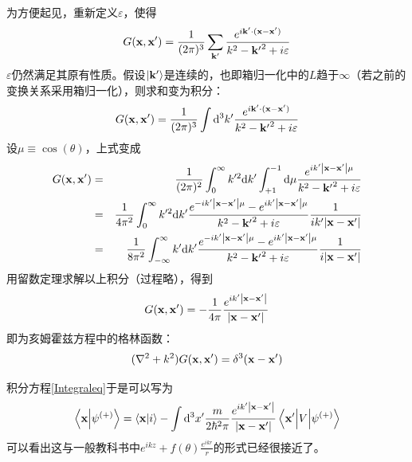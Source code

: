 \documentclass[hyperref]{ctexart}
\begin{document}
为方便起见，重新定义$\varepsilon$，使得
\begin{equation}\label{g4}
  G(\vb{x},\vb{x'})=\frac{1}{(2\pi)^3}\sum_{\vb{k'}}\frac{e^{i\vb{k'}\cdot(\vb{x}-\vb{x'})}}{k^2-\vb{k'}^2+i\varepsilon}
\end{equation}
$\varepsilon$仍然满足其原有性质。假设$\ket{\vb{k'}}$是连续的，也即箱归一化中的$L$趋于$\infty$（若之前的变换关系采用箱归一化），则求和变为积分：
\begin{equation}
   G(\vb{x},\vb{x'})=\frac{1}{(2\pi)^3}\int\dd^3k'\frac{e^{i\vb{k'}\cdot(\vb{x}-\vb{x'})}}{k^2-\vb{k'}^2+i\varepsilon}
\end{equation}
设$\mu\equiv\cos(\theta)$，上式变成
\begin{eqnarray}
  G(\vb{x},\vb{x'})&=& \frac{1}{(2\pi)^2}\int_0^{\infty}k'^2\dd k'\int_{+1}^{-1}\dd\mu\frac{e^{ik'\abs{\vb{x}-\vb{x'}}\mu}}{k^2-\vb{k'}^2+i\varepsilon} \\
   &=& \frac{1}{4\pi^2}\int_0^{\infty}k'^2\dd k'\frac{e^{-ik'\abs{\vb{x}-\vb{x'}}\mu}-e^{ik'\abs{\vb{x}-\vb{x'}}\mu}}{k^2-\vb{k'}^2+i\varepsilon}\frac{1}{ik'\abs{\vb{x}-\vb{x'}}}\\
   &=& \frac{1}{8\pi^2}\int_{-\infty}^{\infty}k'\dd k'\frac{e^{-ik'\abs{\vb{x}-\vb{x'}}\mu}-e^{ik'\abs{\vb{x}-\vb{x'}}\mu}}{k^2-\vb{k'}^2+i\varepsilon}\frac{1}{i\abs{\vb{x}-\vb{x'}}}
\end{eqnarray}
用留数定理求解以上积分（过程略），得到
\begin{equation}\label{g5}
   G(\vb{x},\vb{x'})=-\frac{1}{4\pi}\frac{e^{ik'\abs{\vb{x}-\vb{x'}}}}{\abs{\vb{x}-\vb{x'}}}
\end{equation}
即为亥姆霍兹方程中的格林函数：
\begin{equation}\label{helm}
  (\nabla^2+k^2)G(\vb{x},\vb{x'})=\delta^3(\vb{x}-\vb{x'})
\end{equation}

积分方程\eqref{Integraleq}于是可以写为
\begin{equation}\label{Inte2}
  \braket{\vb{x}}{\psi^{(+)}}=\braket{\vb{x}}{i}-\int\dd^3x'\frac{m}{2\hbar^2\pi}\frac{e^{ik'\abs{\vb{x}-\vb{x'}}}}{\abs{\vb{x}-\vb{x'}}}\mel{\vb{x'}}{V}{\psi^{(+)}}
\end{equation}
可以看出这与一般教科书中$\displaystyle e^{ikz}+f(\theta)\frac{e^{ikr}}{r}$的形式已经很接近了。
\end{document}
